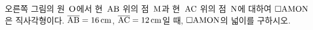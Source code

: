 \noindent\begin{minipage}[t]{0.58\linewidth}\vspace{0pt}\raggedright 오른쪽 그림의 원~$\mathrm{O}$에서 현~$\mathrm{AB}$ 위의 점~$\mathrm{M}$과 현~$\mathrm{AC}$ 위의 점~$\mathrm{N}$에 대하여 $\square\mathrm{AMON}$은 직사각형이다. $\overline{\mathrm{AB}}=16\,\mathrm{cm}$, $\overline{\mathrm{AC}}=12\,\mathrm{cm}$일 때, $\square\mathrm{AMON}$의 넓이를 구하시오.\end{minipage}\hfill\begin{minipage}[t]{0.4\linewidth}\vspace{0pt}\centering \resizebox{\ifdim\width>\linewidth\linewidth\else\width\fi}{!}{}\end{minipage}\par
